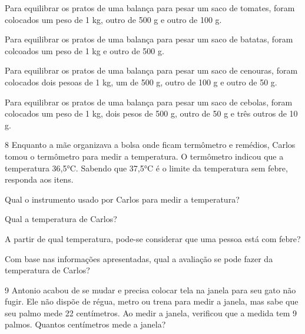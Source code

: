 \begin{escolha}
\item
  Para equilibrar os pratos de uma balança para pesar um saco de tomates, foram colocados um peso de 1 kg, outro de 500 g e outro de 100 g.

\item
  Para equilibrar os pratos de uma balança para pesar um saco de batatas, foram colcoados um peso de 1 kg e outro de 500 g.

\item
  Para equilibrar os pratos de uma balança para pesar um saco de cenouras, foram colocados dois pesoas de 1 kg, um de 500 g, outro de 100 g e outro de 50 g.

\item
  Para equilibrar os pratos de uma balança para pesar um saco de cebolas, foram colocados um peso de 1 kg, dois pesos de 500 g, outro de 50 g e três outros de 10 g.
\end{escolha}

\num{8} Enquanto a mãe organizava a bolsa onde ficam termômetro e remédios, Carlos tomou o termômetro para medir a temperatura. O termômetro indicou que a temperatura 36,5°C. Sabendo que 37,5°C é o limite da temperatura sem febre, responda aos itens.

\begin{escolha} 
\item Qual o instrumento usado por Carlos para medir a temperatura?

\item Qual a temperatura de Carlos?

\item A partir de qual temperatura, pode-se considerar que uma pessoa está com febre?

\item Com base nas informações apresentadas, qual a avaliação se pode fazer da temperatura de Carlos?
\end{escolha}


\num{9} Antonio acabou de se mudar e precisa colocar tela na janela para seu gato não fugir.
Ele não dispõe de régua, metro ou trena para medir a janela, mas sabe que seu palmo mede 22 centímetros. Ao medir a janela, verificou que a medida tem 9 palmos. Quantos centímetros mede a janela?

